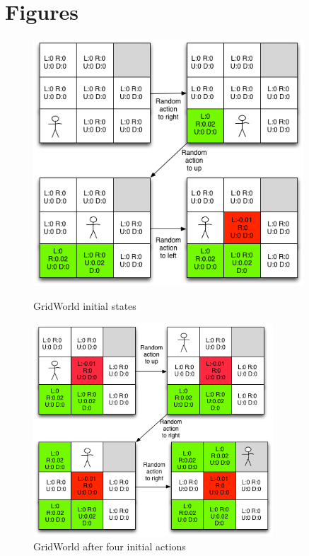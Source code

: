 \chapter{Figures}
\begin{figure}[h!]
\centering
\includegraphics[width=0.9\textwidth]{./images/mdpgrid1.png}
\caption{GridWorld initial states}
\label{fig:gridworld1}
\centering
\includegraphics[width=0.8\textwidth]{./images/mdpgrid1-2.png}
\caption{GridWorld after four initial actions}
\label{fig:gridworld2}
\end{figure}

